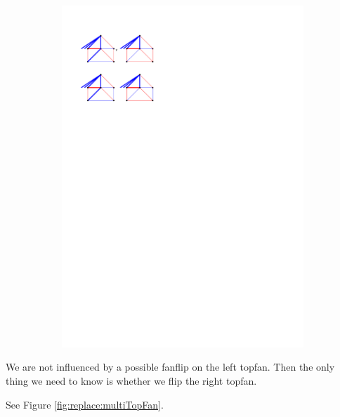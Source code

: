 \begin{figure}
\begin{subfigure}[b]{0.45 \textwidth}
        \includegraphics[width =\textwidth]{chordReplace/img/stopSingleTopFan}
        \caption{}
        \label{fig:replace:stopSingleTopFan}
    \end{subfigure}
    	\caption{}

\end{figure}

We are not influenced by a possible fanflip on the left topfan. Then the only thing we need to know is whether we flip the right topfan.

See Figure \ref{fig:replace:multiTopFan}.

